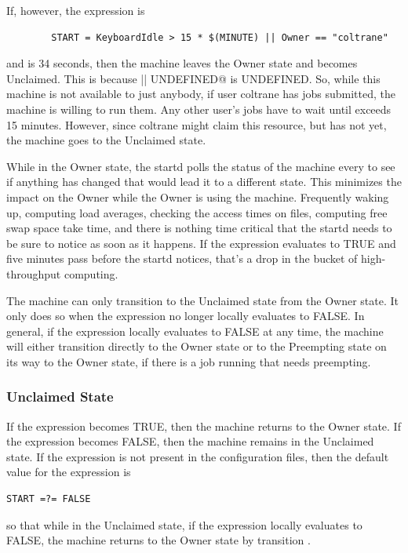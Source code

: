 If, however, the  expression is
\begin{verbatim}
        START = KeyboardIdle > 15 * $(MINUTE) || Owner == "coltrane"
\end{verbatim}
and  is 34 seconds, then the machine
leaves the Owner state and becomes Unclaimed.
This is because
\verb@FALSE || UNDEFINED@ is UNDEFINED.
So, while this machine is not available to just anybody,
if user coltrane has jobs submitted, the machine is willing to run them.
Any other user's jobs have to wait
until  exceeds 15 minutes.
However, since coltrane might claim this resource,
but has not yet, the machine goes to the Unclaimed state.

While in the Owner state, the startd polls the status of the
machine every  to see if anything has changed
that would lead it to a different state.
This minimizes the impact on the Owner
while the Owner is using the machine.
Frequently waking up, computing load averages, checking the access
times on files, computing free swap space take time,
and there is nothing
time critical that the startd needs to be sure to notice as soon as it
happens.
If the  expression evaluates to TRUE and five
minutes pass before the startd notices,
that's a drop in the bucket of high-throughput computing.

The machine can only transition to the Unclaimed state from the Owner state.
It only does so when the  expression no longer locally
evaluates to FALSE.
In general, if the 
expression locally evaluates to FALSE at any time,
the machine will either transition directly to the Owner state
or to the Preempting state on its way to the Owner state,
if there is a job running that needs preempting.

\subsubsection{\label{sec:Unclaimed-State}Unclaimed State}

If the  expression becomes TRUE, then the machine returns
to the Owner state.
If the  expression becomes FALSE, then the machine remains
in the Unclaimed state.
If the  expression is not present in the configuration files,
then the default value for the  expression is 
\begin{verbatim}
START =?= FALSE
\end{verbatim}
so that
while in the Unclaimed state, if the  expression locally
evaluates to FALSE, the machine returns to the Owner state by
transition .

